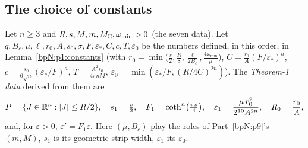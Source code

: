 \subsection{The choice of constants}\label{bpN:p10:s-choice}

\begin{definition}\label{bpN:p10:choice}
Let $n\ge3$ and $R,s,M,m,M_{\mathbb{C}},\omega_{\min}>0$ (the seven data). Let $q,B_c,\mu,\ell,r_0,A,s_0,\sigma,F,\varepsilon_*,C,c,T,\varepsilon_0$ be the numbers defined, in this order, in
Lemma~\ref{bpN:p1:constants} (with $r_0=\min\bigl(\frac s2,\frac R8,\frac\ell{2B_c},\frac{4\omega_{\min}}\mu\bigr)$, $C=\frac{r_0}A(F/\varepsilon_*)^a$, $c=\frac{s_0}{6\sqrt n}(\varepsilon_*/F)^a$,
$T=\frac{A^2s_0}{4\pi nM}$, $\varepsilon_0=\min(\varepsilon_*/F,(R/4C)^{2n})$). The \emph{Theorem-1 data} derived from them are
\[P=\{J\in\mathbb{R}^n:\lvert J\rvert\le R/2\},\quad s_1=\tfrac s2,\quad F_1=\coth^n\bigl(\tfrac{\pi s}4\bigr),\quad \varepsilon_1=\frac{\mu\,r_0^2}{2^{10}A^{2n}},\quad R_0=\frac{r_0}A,\]
and, for $\varepsilon>0$, $\varepsilon'=F_1\varepsilon$. Here $(\mu,B_c)$ play the roles of Part~\ref{bpN:p9}'s $(m,M)$, $s_1$ is its geometric strip width, $\varepsilon_1$ its $\varepsilon_0$.
\end{definition}

